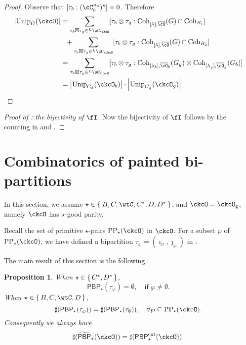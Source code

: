 \documentclass[12pt,a4paper]{amsart}
\def\abs#1{\left|{#1}\right|}
\numberwithin{equation}{section}
\newtheorem{prop}[thm]{Proposition}
\theoremstyle{remark}
\def\Unip{\mathrm{Unip}}
\def\LC{{}^{\scriptscriptstyle L}\sC}
\def\nbb{n_{\mathrm b}}
\def\Coh{\mathrm{Coh}}
\def\CPPs{\mathrm{PP}_{\star}}
\def\tPBP{\widetilde{\mathsf{PBP}}}
\def\PBPe{\mathsf{PBP}^{\mathrm{ext}}}
\def\PBP{\mathsf{PBP}}
\def\ckcOg{\ckcO_{\mathrm g}}
\def\tPBP{\widetilde{\mathsf{PBP}}}
\def\PBPe{\mathsf{PBP}^{\mathrm{ext}}}
\begin{document}
\begin{proof}
  Observe that $[\tau_{b}:(\cC_{b}^{\nbb})^{s}]=0$. Therefore
  \[
    \begin{split}
      \abs{\Unip_{G}(\ckcO)} & = \sum_{\tau_{b}\boxtimes \tau_{g}\in \LC_{\ckcO}} [\tau_{b}\otimes \tau_{g}:\Coh_{[\lambda],\bcO}(G)\cap \Coh_{B_1}]\\
    & \ \ + \sum_{\tau_{b}\boxtimes \tau_{g}\in \LC_{\ckcO}}[\tau_{b}\otimes \tau_{g}:\Coh_{[\lambda],\bcO}(G)\cap \Coh_{B_2}] \\
  &= \sum_{\tau_{b}\boxtimes \tau_{g}\in \LC_{\ckcO}} [\tau_{b}\otimes \tau_{g}:
  \Coh_{[\lambda_{b}],\bcO_{b}}(G_{g})\otimes \Coh_{[\lambda_{g}],\bcO_{g}}(G_{b})]\\
  &= \abs{\Unip_{G_{b}}(\ckcO_{b})}\cdot \abs{\Unip_{G_{g}}(\ckcO_{g})}
\end{split}
\]
\end{proof}

\begin{proof}[{Proof of : the bijectivity of $\fI$}]
Now the bijectivity of $\fI$ follows by the counting in   and .
\end{proof}


%



\section{Combinatorics of painted bi-partitions}

In this section, we assume $\star \in \Set{B,C,\wtC,C^{*},D,D^{*}}$, and $\ckcO = \ckcOg$, namely $\ckcO $ has $\star$-good parity.

Recall the set of primitive $\star$-pairs $\CPPs(\ckcO)$ in $\ckcO$. For a subset $\wp$ of $\CPPs(\ckcO)$, we have defined a bipartition $\tau_{\wp}=(\imath_{\wp},\jmath_{\wp})$ in .

The main result of this section is the following

\begin{prop} \label{prop:PBP} When $\star\in \set{C^{*}, D^{*}}$,
  \[
    \PBP_{\star}(\tau_{\wp}) = \emptyset, \quad \text{if } \wp \neq \emptyset.
  \]
  When $\star\in \set{B,C,\wtC,D}$,
  \[
    \sharp(\PBP_{\star}(\tau_{\wp})) = \sharp(\PBP_{\star}(\tau_{\emptyset})), \quad \forall \wp \subseteq \CPPs(\ckcO).
  \]
 Consequently we always have
  \[
    \sharp(\tPBP_{\star}(\ckcO)) = \sharp(\PBPe_{\star}(\ckcO)).
  \]
\end{prop}
\end{document}
